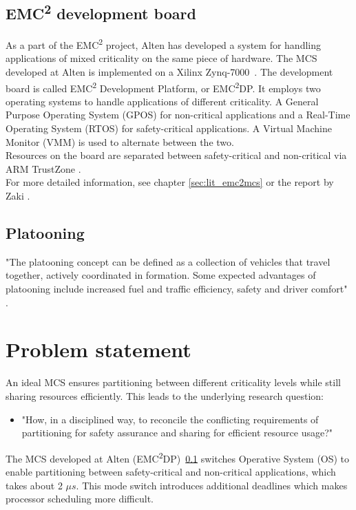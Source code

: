 \subsection{EMC\textsuperscript{2} development board}
\label{sec:mces}
As a part of the EMC\textsuperscript{2} project, Alten has developed a system for handling applications of mixed criticality on the same piece of hardware. The MCS developed at Alten is implemented on a Xilinx Zynq-7000~\cite{website:xilinx}. The development board is called EMC\textsuperscript{2} Development Platform, or EMC\textsuperscript{2}DP. It employs two operating systems to handle applications of different criticality. A General Purpose Operating System (GPOS) for non-critical applications and a Real-Time Operating System (RTOS) for safety-critical applications. A Virtual Machine Monitor (VMM) is used to alternate between the two.\\ %

Resources on the board are separated between safety-critical and non-critical via ARM TrustZone \cite{website:ARM}.\\

For more detailed information, see chapter \ref{sec:lit_emc2mcs} or the report by Zaki \cite{zaki2016}.

\subsection{Platooning}
\label{sec:platooning}
"The platooning concept can be defined as a collection of  vehicles that travel together, actively coordinated in formation. Some expected advantages of platooning include increased fuel and traffic efficiency, safety and driver comfort" \cite{bergenhem}.

\section{Problem statement}
\label{sec:problem}
An ideal MCS ensures partitioning between different criticality levels while still sharing resources efficiently. This leads to the underlying research question:
\begin{itemize}
\item "How, in a disciplined way, to reconcile the conflicting requirements of partitioning for safety assurance and sharing for efficient resource usage?" \cite{burns2016}
\end{itemize}
The MCS developed at Alten (EMC\textsuperscript{2}DP)~\ref{sec:mces} switches Operative System (OS) to enable partitioning between safety-critical and non-critical applications, which takes about 2 $\mu s$. This mode switch introduces additional deadlines which makes processor scheduling more difficult.\\ %

